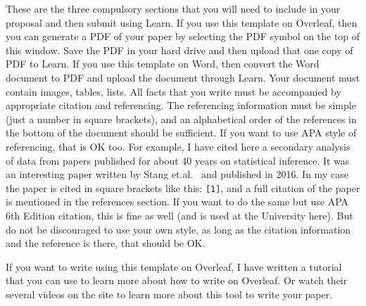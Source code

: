 These are the three compulsory sections that you will need to include in your proposal and then submit using Learn. If you use this template on Overleaf, then you can generate a PDF of your paper by selecting the PDF symbol on the top of this window. Save the PDF in your hard drive and then upload that one copy of PDF to Learn. If you use this template on Word, then convert the Word document to PDF and upload the document through Learn. Your document must contain images, tables, lists. All facts that you write must be accompanied by appropriate citation and referencing. The referencing information must be simple (just a number in square brackets), and an alphabetical order of the references in the bottom of the document should be sufficient. If you want to use APA style of referencing, that is OK too. For example, I have cited here a secondary analysis of data from papers published for about 40 years on statistical inference. It was an interesting paper written by Stang et.al.~\cite{Stang:2016ca} and published in 2016. In my case the paper is cited in square brackets like this: \texttt{[1]}, and a full citation of the paper is mentioned in the references section. If you want to do the same but use APA 6th Edition citation, this is fine as well (and is used at the University here). But do not be discouraged to use your own style, as long as the citation information and the reference is there, that should be OK. 

If you want to write using this template on Overleaf, I have written a tutorial that you can use to learn more about how to write on Overleaf. Or watch their several videos on the site to learn more about this tool to write your paper. 

